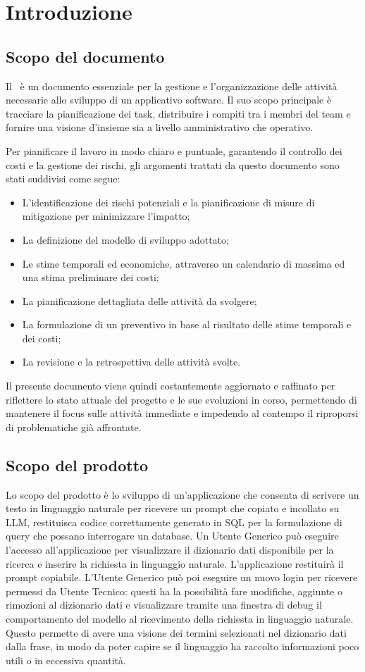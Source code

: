 \section{Introduzione}
\label{sec:introduzione}

\subsection{Scopo del documento}
Il \PdP\ è un documento essenziale per la gestione e l'organizzazione delle attività necessarie allo sviluppo di un applicativo software. Il suo scopo principale è tracciare la pianificazione dei task, distribuire i compiti tra i membri del team e fornire una visione d'insieme sia a livello amministrativo che operativo.

Per pianificare il lavoro in modo chiaro e puntuale, garantendo il controllo dei costi e la gestione dei rischi, gli argomenti trattati da questo documento sono stati suddivisi come segue:
\begin{itemize}
  \item L'identificazione dei rischi potenziali e la pianificazione di misure di mitigazione per minimizzare l'impatto;
  \item La definizione del modello di sviluppo adottato;
  \item Le stime temporali ed economiche, attraverso un calendario di massima ed una stima preliminare dei costi;
  \item La pianificazione dettagliata delle attività da svolgere;
  \item La formulazione di un preventivo in base al risultato delle stime temporali e dei costi;
  \item La revisione e la retrospettiva delle attività svolte.
\end{itemize}
Il presente documento viene quindi costantemente aggiornato e raffinato per riflettere lo stato attuale del progetto e le sue evoluzioni in corso, permettendo di mantenere il focus sulle attività immediate e impedendo al contempo il riproporsi di problematiche già affrontate.
\subsection{Scopo del prodotto}
Lo scopo del prodotto è lo sviluppo di un'applicazione che consenta di scrivere un testo in linguaggio naturale per ricevere un prompt che copiato e incollato su LLM, restituisca codice correttamente generato in SQL per la formulazione di query che possano interrogare un database. 
Un Utente Generico può eseguire l'accesso all'applicazione per visualizzare il dizionario dati disponibile per la ricerca e inserire la richiesta in linguaggio naturale. 
L'applicazione restituirà il prompt copiabile. 
L'Utente Generico può poi eseguire un nuovo login per ricevere permessi da Utente Tecnico: questi ha la possibilità fare modifiche, aggiunte o rimozioni al dizionario dati e visualizzare tramite una finestra di debug il comportamento del modello al ricevimento della richiesta in linguaggio naturale. 
Questo permette di avere una visione dei termini selezionati nel dizionario dati dalla frase, in modo da poter capire se il linguaggio ha raccolto informazioni poco utili o in eccessiva quantità.

